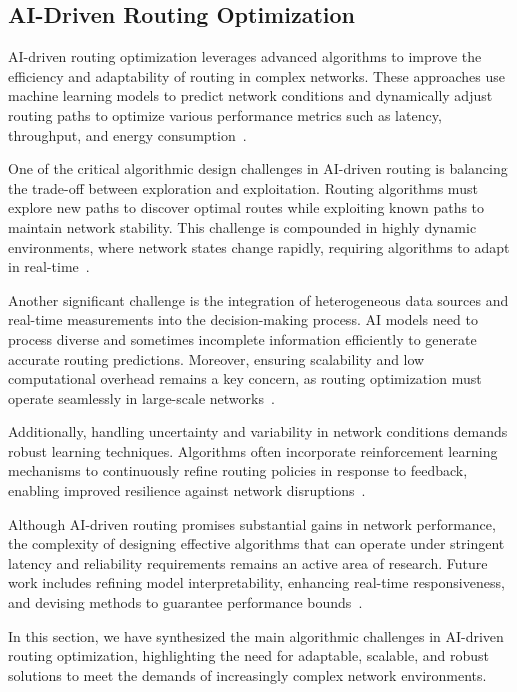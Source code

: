 \documentclass[sigconf]{acmart}
\begin{document}
\subsection{AI-Driven Routing Optimization}

AI-driven routing optimization leverages advanced algorithms to improve the efficiency and adaptability of routing in complex networks. These approaches use machine learning models to predict network conditions and dynamically adjust routing paths to optimize various performance metrics such as latency, throughput, and energy consumption~\cite{}.

One of the critical algorithmic design challenges in AI-driven routing is balancing the trade-off between exploration and exploitation. Routing algorithms must explore new paths to discover optimal routes while exploiting known paths to maintain network stability. This challenge is compounded in highly dynamic environments, where network states change rapidly, requiring algorithms to adapt in real-time~\cite{}.

Another significant challenge is the integration of heterogeneous data sources and real-time measurements into the decision-making process. AI models need to process diverse and sometimes incomplete information efficiently to generate accurate routing predictions. Moreover, ensuring scalability and low computational overhead remains a key concern, as routing optimization must operate seamlessly in large-scale networks~\cite{}.

Additionally, handling uncertainty and variability in network conditions demands robust learning techniques. Algorithms often incorporate reinforcement learning mechanisms to continuously refine routing policies in response to feedback, enabling improved resilience against network disruptions~\cite{}.

Although AI-driven routing promises substantial gains in network performance, the complexity of designing effective algorithms that can operate under stringent latency and reliability requirements remains an active area of research. Future work includes refining model interpretability, enhancing real-time responsiveness, and devising methods to guarantee performance bounds~\cite{}.

In this section, we have synthesized the main algorithmic challenges in AI-driven routing optimization, highlighting the need for adaptable, scalable, and robust solutions to meet the demands of increasingly complex network environments.
\end{document}
